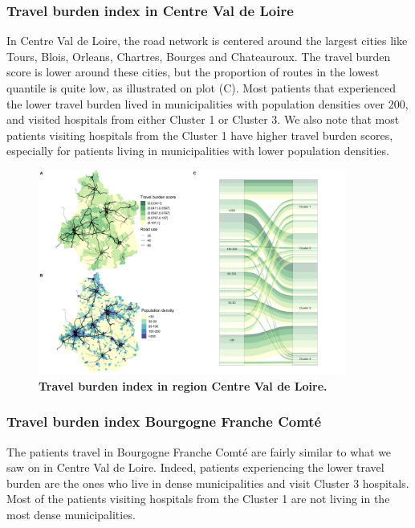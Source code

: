 \subsubsection{Travel burden index in Centre Val de Loire}

In Centre Val de Loire, the road network is centered around the largest cities
like Tours, Blois, Orleans, Chartres, Bourges and Chateauroux. The travel burden
score is lower around these cities, but the proportion of routes in the lowest
quantile is quite low, as illustrated on plot (C). Most patients that
experienced the lower travel burden lived in municipalities with population
densities over 200, and visited hospitals from either Cluster 1 or Cluster 3.
We also note that most patients visiting hospitals from the Cluster 1 have higher
travel burden scores, especially for patients living in municipalities
with lower population densities.

\begin{figure}[H]
    \includegraphics[width=0.9\textwidth]{images/routes/fig4_24.png}
    \centering
    \caption{
        \textbf{Travel burden index in region Centre Val de Loire.}
    }
    \label{fig:routes-burden-index-cvdl}
\end{figure}

\subsubsection{Travel burden index Bourgogne Franche Comté}

The patients travel in Bourgogne Franche Comté are fairly similar to what we
saw on in Centre Val de Loire. Indeed, patients experiencing the lower travel
burden are the ones who live in dense municipalities and visit Cluster 3
hospitals. Most of the patients visiting hospitals from the Cluster 1 are not
living in the most dense municipalities.

